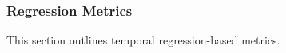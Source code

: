 \subsubsection{Regression Metrics}
\label{sec:regressionmetrics}

This section outlines temporal regression-based metrics.